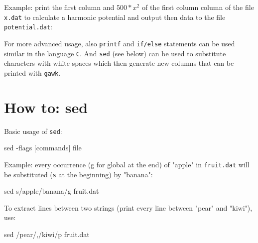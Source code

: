 \documentclass[
  letterpaper,
]{article}
\newenvironment{Shaded}{\begin{snugshade}}{\end{snugshade}}
\newcommand{\AttributeTok}[1]{\textcolor[rgb]{0.40,0.45,0.13}{#1}}
\newcommand{\FunctionTok}[1]{\textcolor[rgb]{0.28,0.35,0.67}{#1}}
\newcommand{\NormalTok}[1]{\textcolor[rgb]{0.00,0.23,0.31}{#1}}
\newcommand{\OperatorTok}[1]{\textcolor[rgb]{0.37,0.37,0.37}{#1}}
\newcommand{\StringTok}[1]{\textcolor[rgb]{0.13,0.47,0.30}{#1}}
\begin{document}
Example: print the first column and \(500*x^2\) of the first column
column of the file \texttt{x.dat} to calculate a harmonic potential and
output then data to the file \texttt{potential.dat}:

\begin{Shaded}
\end{Shaded}

For more advanced usage, also \texttt{printf} and \texttt{if/else}
statements can be used similar in the language \texttt{C}. And
\texttt{sed} (see below) can be used to substitute characters with white
spaces which then generate new columns that can be printed with
\texttt{gawk}.

\hypertarget{how-to-sed}{%
\section*{How to: sed}\label{how-to-sed}}


Basic usage of \texttt{sed}:

\begin{Shaded}
\begin{Highlighting}[]
\FunctionTok{sed} \AttributeTok{{-}flags} \StringTok{\textquotesingle{}[commands]\textquotesingle{}}\NormalTok{ file}
\end{Highlighting}
\end{Shaded}

Example: every occurrence (g for global at the end) of "apple" in
\texttt{fruit.dat} will be substituted (\texttt{s} at the beginning) by
"banana":

\begin{Shaded}
\begin{Highlighting}[]
\FunctionTok{sed} \StringTok{\textquotesingle{}s/apple/banana/g\textquotesingle{}}\NormalTok{ fruit.dat}
\end{Highlighting}
\end{Shaded}

To extract lines between two strings (print every line between "pear"
and "kiwi"), use:

\begin{Shaded}
\begin{Highlighting}[]
\FunctionTok{sed} \StringTok{\textquotesingle{}/pear/,/kiwi/p\textquotesingle{}}\NormalTok{ fruit.dat}
\end{Highlighting}
\end{Shaded}
\end{document}
